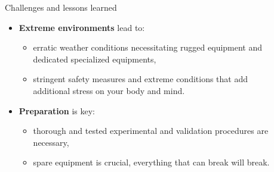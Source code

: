 \documentclass[final,hyperref={pdfpagelabels=false}]{beamer}
\begin{document}
\begin{frame}[t]
\begin{columns}[t]
\begin{column}{.465\textwidth}

\end{column} %

\begin{column}{.03\textwidth}\end{column} %
 
\begin{column}{.465\textwidth} %
	

\begin{block}{Challenges and lessons learned}
	\begin{itemize}
		\item \textbf{Extreme environments} lead to:
		\begin{itemize}
			\item erratic weather conditions necessitating rugged equipment and dedicated specialized equipments,
			\item stringent safety measures and extreme conditions that add additional stress on your body and mind.
		\end{itemize}
		\item \textbf{Preparation} is key:
		\begin{itemize}
			\item thorough and tested experimental and validation procedures are necessary,
			\item spare equipment is crucial, everything that can break will break.
		\end{itemize}
	\end{itemize}
\end{block}



\end{column}
\end{columns}
\end{frame}
\end{document}
